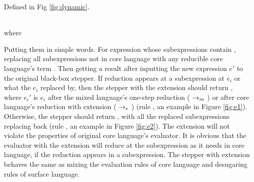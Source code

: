 \begin{Def} Defined in Fig \ref{fig:dynamic}.



\end{Def}

\begin{figure*}[t]
{}
{\\where~}
{}
\caption{Dynamic reduction}
\label{fig:dynamic}
\end{figure*}


Putting them in simple words. For expression  whose subexpressions contain , replacing all  subexpressions not in core language with any reducible core language's term . Then getting a result after inputting the new expression $e'$ to the original black-box stepper. If reduction appears at a subexpression at $e_i$ or what the $e_i$ replaced by, then the stepper with the extension should return , where $e_i'$ is $e_i$ after the mixed language's one-step reduction ($~\rightarrow_m~$) or after core language's reduction with extension ($~\rightarrow_e~$) (rule , an example in Figure \ref{fig:e1}). Otherwise, the stepper should return , with all the replaced subexpressions replacing back (rule , an example in Figure \ref{fig:e2}). The extension will not violate the properties of original core language's evaluator. It is obvious that the evaluator with the extension will reduce at the subexpression as it needs in core language, if the reduction appears in a subexpression. The stepper with extension behaves the same as mixing the evaluation rules of core language and desugaring rules of surface language.

